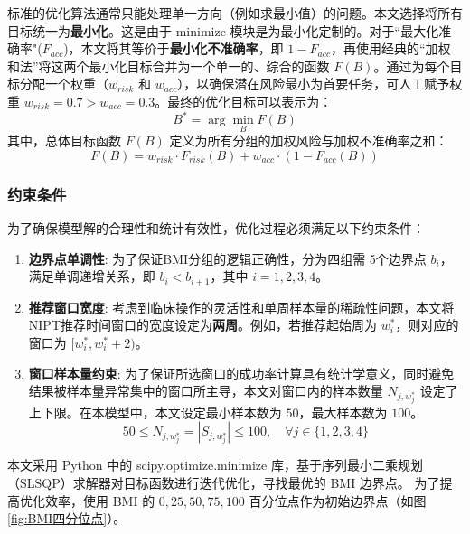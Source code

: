 标准的优化算法通常只能处理单一方向（例如求最小值）的问题。本文选择将所有目标统一为\textbf{最小化}。这是由于 minimize 模块是为最小化定制的。对于``最大化准确率"($F_{acc}$)，本文将其等价于\textbf{最小化不准确率}，即 $1 - F_{acc}$，再使用经典的“加权和法”将这两个最小化目标合并为一个单一的、综合的函数 $F(B)$。通过为每个目标分配一个权重（$w_{risk}$ 和 $w_{acc}$），以确保潜在风险最小为首要任务，可人工赋予权重 $w_{risk} = 0.7 > w_{acc} = 0.3$。最终的优化目标可以表示为：
\begin{equation}
    B^* = \arg\min_{B} F(B)
    \label{eq:optimization_goal}
\end{equation}
其中，总体目标函数 $F(B)$ 定义为所有分组的加权风险与加权不准确率之和：
\begin{equation}
    F(B) = w_{risk} \cdot F_{risk}(B) + w_{acc} \cdot \left( 1 - F_{acc}(B) \right)
    \label{eq:objective_function_final}
\end{equation}

\subsubsection{约束条件}

为了确保模型解的合理性和统计有效性，优化过程必须满足以下约束条件：

\begin{enumerate}
    \item \textbf{边界点单调性}: 为了保证BMI分组的逻辑正确性，分为四组需 5个边界点 $b_i$，满足单调递增关系，即 $b_i < b_{i+1}$，其中 $i = 1, 2, 3, 4$。

    \item \textbf{推荐窗口宽度}: 考虑到临床操作的灵活性和单周样本量的稀疏性问题，本文将NIPT推荐时间窗口的宽度设定为\textbf{两周}。例如，若推荐起始周为 $w_i^*$，则对应的窗口为 $[w_i^*, w_i^*+2)$。

    \item \textbf{窗口样本量约束}: 为了保证所选窗口的成功率计算具有统计学意义，同时避免结果被样本量异常集中的窗口所主导，本文对窗口内的样本数量 $N_{j, w_j^*}$ 设定了上下限。在本模型中，本文设定最小样本数为 $50$，最大样本数为 $100$。
          \begin{equation}
              50 \le N_{j, w_j^*} = |S_{j, w_j^*}| \le 100, \quad \forall j \in \{1, 2, 3, 4\}
              \label{eq:constraint_new}
          \end{equation}
\end{enumerate}

本文采用 Python 中的 scipy.optimize.minimize 库，基于序列最小二乘规划（SLSQP）求解器对目标函数进行迭代优化，寻找最优的 BMI 边界点。
为了提高优化效率，使用 BMI 的 $0, 25, 50, 75, 100$ 百分位点作为初始边界点（如图 \ref{fig:BMI四分位点}）。

